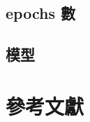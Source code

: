 \documentclass[final,3p]{elsarticle}
\begin{document}
	\subsection{epochs 數}
	
	\subsection{模型}
		


%  
% 
% 
% 
% 
% 
% 
% 
% 
% 
% 
% 
% 

\section{參考文獻}


	
\end{document}
